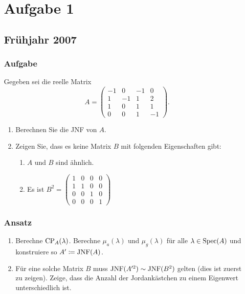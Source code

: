 \chapter{Aufgabe 1}

\section{Frühjahr 2007}

\subsection{Aufgabe}
Gegeben sei die reelle Matrix
\begin{equation*}
	A = \begin{pmatrix}
		-1 & 0 & -1 & 0 \\
		1 & -1 & 1 & 2 \\
		1 & 0 & 1 & 1 \\
		0 & 0 & 1 & -1
	\end{pmatrix}\text{.}
\end{equation*}
\begin{enumerate}
	\item Berechnen Sie die JNF von \( A \).
	\item Zeigen Sie, dass es keine Matrix \( B \) mit folgenden Eigenschaften gibt:
	\begin{enumerate}
	 	\item \( A \) und \( B \) sind ähnlich.
	 	\item Es ist \( B^2 = \left( \begin{smallmatrix}
	 		1 & 0 & 0 & 0 \\
	 		1 & 1 & 0 & 0 \\
	 		0 & 0 & 1 & 0 \\
	 		0 & 0 & 0 & 1
	 	\end{smallmatrix} \right) \) 
	 \end{enumerate} 
\end{enumerate}

\subsection{Ansatz}
\begin{enumerate}
	\item Berechne \( \text{CP}_A(\lambda) \). Berechne  \( \mu_a(\lambda) \) und \( \mu_g(\lambda) \) für alle \( \lambda \in \text{Spec}(A) \) und konstruiere so \( A' \coloneqq \text{JNF}(A) \).
	\item Für eine solche Matrix \( B \) muss \( \text{JNF}(A'^2) \sim \text{JNF}(B^2) \) gelten (dies ist zuerst zu zeigen). Zeige, dass die Anzahl der Jordankästchen zu einem Eigenwert unterschiedlich ist.
\end{enumerate}

